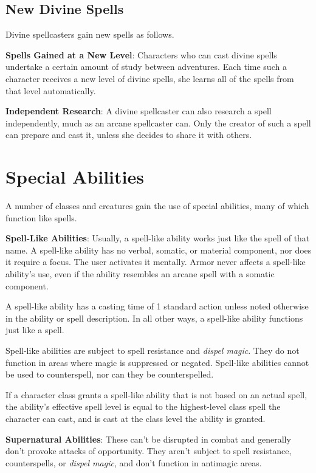 \subsection{New Divine Spells}

				
Divine spellcasters gain new spells as follows.
				
\textbf{Spells Gained at a New Level}: Characters who can cast divine spells undertake a certain amount of study between adventures. Each time such a character receives a new level of divine spells, she learns all of the spells from that level automatically.
				
\textbf{Independent Research}: A divine spellcaster can also research a spell independently, much as an arcane spellcaster can. Only the creator of such a spell can prepare and cast it, unless she decides to share it with others.
				
\section{Special Abilities}

				
A number of classes and creatures gain the use of special abilities, many of which function like spells.
				
\textbf{Spell-Like Abilities}: Usually, a spell-like ability works just like the spell of that name. A spell-like ability has no verbal, somatic, or material component, nor does it require a focus. The user activates it mentally. Armor never affects a spell-like ability's use, even if the ability resembles an arcane spell with a somatic component.
				
A spell-like ability has a casting time of 1 standard action unless noted otherwise in the ability or spell description. In all other ways, a spell-like ability functions just like a spell.
				
Spell-like abilities are subject to spell resistance and \textit{dispel magic}. They do not function in areas where magic is suppressed or negated. Spell-like abilities cannot be used to counterspell, nor can they be counterspelled.
				
If a character class grants a spell-like ability that is not based on an actual spell, the ability's effective spell level is equal to the highest-level class spell the character can cast, and is cast at the class level the ability is granted.
				
\textbf{Supernatural Abilities}: These can't be disrupted in combat and generally don't provoke attacks of opportunity. They aren't subject to spell resistance, counterspells, or \textit{dispel magic}, and don't function in antimagic areas.
				
